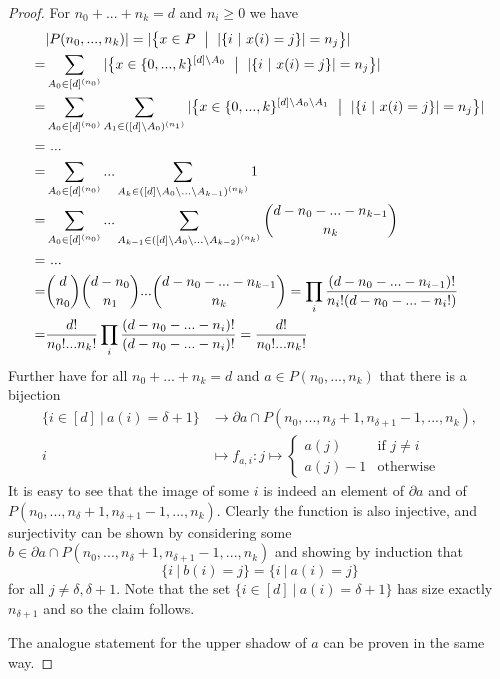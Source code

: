 \documentclass{scrartcl}
\theoremstyle{definition}
\begin{document}
\begin{proof}
    For $n_0 + ... + n_k = d$ and $n_i \geq 0$ we have
    \begin{align*}
        &|P(n_0, ..., n_k)| = |\bigl\{ x \in P \ \bigm| \ |\{i \ | \ x(i) = j\}| = n_j\bigl\}| \\
        =& \sum_{A_0 \in [d]^{(n_0)}} |\bigl\{ x \in \{0, ..., k\}^{[d] \setminus A_0} \ \bigm| \ |\{i \ | \ x(i) = j\}| = n_j\bigl\}| \\
        =& \sum_{A_0 \in [d]^{(n_0)}} \sum_{A_1 \in ([d] \setminus A_0)^{(n_1)}} |\bigl\{ x \in \{0, ..., k\}^{[d] \setminus A_0 \setminus A_1} \ \bigm| \ |\{i \ | \ x(i) = j\}| = n_j\bigl\}| \\
        =& \ ... \\
        =& \sum_{A_0 \in [d]^{(n_0)}} ... \sum_{A_k \in ([d] \setminus A_0 \setminus ... \setminus A_{k - 1})^{(n_k)}} 1 \\
        =& \sum_{A_0 \in [d]^{(n_0)}} ... \sum_{A_{k - 1} \in ([d] \setminus A_0 \setminus ... \setminus A_{k - 2})^{(n_k)}} {d - n_0 - ... - n_{k - 1} \choose n_k} \\
        =& \ ... \\
        =& {d \choose n_0} {d - n_0 \choose n_1} ... {d - n_0 - ... - n_{k - 1} \choose n_k} = \prod_i \frac {(d - n_0 - ... - n_{i - 1})!} {n_i! (d - n_0 - ... - n_i!)} \\
        =& \frac {d!} {n_0! ... n_k!} \prod_i \frac {(d - n_0 - ... - n_i)!} {(d - n_0 - ... - n_i)!} = \frac {d!} {n_0! ... n_k!}
    \end{align*}
    Further have for all $n_0 + ... + n_k = d$ and $a \in P(n_0, ..., n_k)$ that there is a bijection
    \begin{align*}
        \{ i \in [d] \ | \ a(i) = \delta + 1 \} &\to \partial a \cap P(n_0, ..., n_\delta + 1, n_{\delta + 1} - 1, ..., n_k), \\
        i &\mapsto f_{a, i}: j \mapsto \begin{cases}
            a(j) & \text{if $j \neq i$} \\
            a(j) - 1 & \text{otherwise}
        \end{cases}
    \end{align*}
    It is easy to see that the image of some $i$ is indeed an element of $\partial a$ and of $P(n_0, ..., n_\delta + 1, n_{\delta + 1} - 1, ..., n_k)$.
    Clearly the function is also injective, and surjectivity can be shown by considering some $b \in \partial a \cap P(n_0, ..., n_\delta + 1, n_{\delta + 1} - 1, ..., n_k)$ and showing by induction that
    \begin{equation*}
        \{ i \ | \ b(i) = j \} = \{ i \ | \ a(i) = j \}
    \end{equation*}
    for all $j \neq \delta, \delta + 1$.
    Note that the set $\{ i \in [d] \ | \ a(i) = \delta + 1 \}$ has size exactly $n_{\delta + 1}$ and so the claim follows.

    The analogue statement for the upper shadow of $a$ can be proven in the same way.
\end{proof}
\end{document}
